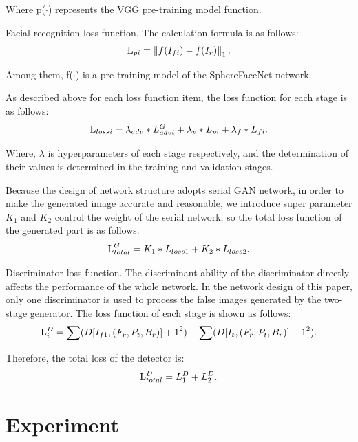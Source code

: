Where p($\cdotp$) represents the VGG pre-training model function. 
	
Facial recognition loss function. The calculation formula is as follows:
\begin{equation}
	\centering
	\text {L}_{pi} = \left\|f(I_{fi}) - f(I_{r}) \right\|_{1} .
\end{equation}

Among them, f($\cdotp$) is a pre-training model of the SphereFaceNet network. 
	
As described above for each loss function item, the loss function for each stage is as follows:
\begin{equation}
	\centering
	\text {L}_{lossi} = \lambda_{adv} * {L}_{advi}^{G} + \lambda_{p} * {L}_{pi} + \lambda_{f} * {L}_{fi} .
\end{equation}

Where, $\lambda$ is hyperparameters of each stage respectively, and the determination of their values is determined in the training and validation stages. 
	
Because the design of network structure adopts serial GAN network, in order to make the generated image accurate and reasonable, we introduce super parameter $K_{1}$ and $K_{2}$ control the weight of the serial network, so the total loss function of the generated part is as follows:
\begin{equation}
	\centering
	\text {L}_{total}^{G} = K_{1} * {L}_{loss1} + K_{2} * {L}_{loss2} .
\end{equation}
	
Discriminator loss function. The discriminant ability of the discriminator directly affects the performance of the whole network. In the network design of this paper, only one discriminator is used to process the false images generated by the two-stage generator. The loss function of each stage is shown as follows:
\begin{equation}
	\centering
	\text {L}_{i}^{D} = \sum({D[I_{f1}, (F_{r}, P_{t}, B_{r})]+1}^{2}) + \sum({D[I_{t}, (F_{r}, P_{t}, B_{r})]-1}^{2}).
\end{equation}

Therefore, the total loss of the detector is:
\begin{equation}
	\centering
	\text {L}_{total}^{D} = {L}_{1}^{D} + {L}_{2}^{D}.
\end{equation}
	
	
\section{Experiment}
	
